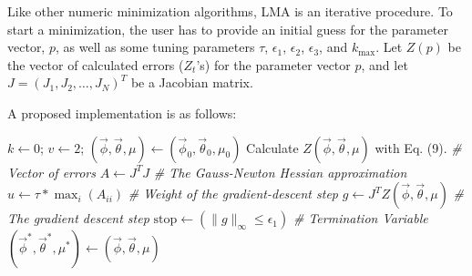 \documentclass[english,12pt]{article}
\begin{document}
Like other numeric minimization algorithms, LMA is an iterative
procedure.  To start a minimization, the user has to provide an
initial guess for the parameter vector, $p$, as well as some tuning
parameters $\tau$, $\epsilon_1$, $\epsilon_2$, $\epsilon_3$, and $k_{\max}$.
Let $Z(p)$ be the vector of calculated errors ($Z_t$'s) for the
parameter vector $p$, and let $J = {(J_{1}, J_{2}, \ldots, J_N)}^T$
be a Jacobian matrix.

A proposed implementation is as follows:

\begin{algorithm}[ht]
    $k \leftarrow 0$; $v \leftarrow 2$;
    $(\vec{\phi},\vec{\theta},\mu) \leftarrow
    (\vec{\phi}_0,\vec{\theta}_0,\mu_0)$\;
    Calculate $Z(\vec{\phi},\vec{\theta},\mu)$ with
    Eq. (9).  \textit{\footnotesize \# Vector of errors}\;
    $A \leftarrow J^T J$   \textit{\footnotesize \# The Gauss-Newton Hessian
    approximation}\;
    $u \leftarrow \tau * \max_i(A_{ii})$ \textit{\footnotesize \# Weight of the
    gradient-descent step}\;
    $g \leftarrow J^T Z(\vec{\phi},\vec{\theta},\mu)$ \textit{\footnotesize \#
    The gradient descent step}\;
	$ \text{stop} \leftarrow (\|g\|_{\infty} \le \epsilon_1)$
    \textit{\footnotesize \# Termination Variable}\;
	$(\vec{\phi}^*,\vec{\theta}^*,\mu^*) \leftarrow (\vec{\phi},\vec{\theta},\mu)$\;


\end{algorithm}
\end{document}
